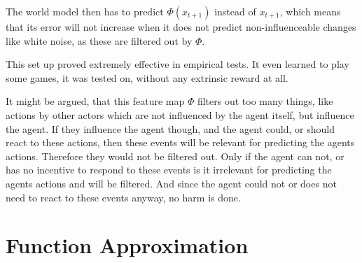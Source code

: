 The world model then has to predict \(\Phi(x_{t+1})\) instead of \(x_{t+1}\), which means that its error will not increase when it does not predict non-influenceable changes like white noise, as these are filtered out by \(\Phi\).

This set up proved extremely effective in empirical tests. It even learned to play some games, it was tested on, without any extrinsic reward at all. 

It might be argued, that this feature map \(\Phi\) filters out too many things, like actions by other actors which are not influenced by the agent itself, but influence the agent. If they influence the agent though, and the agent could, or should react to these actions, then these events will be relevant for predicting the agents actions. Therefore they would not be filtered out. Only if the agent can not, or has no incentive to respond to these events is it irrelevant for predicting the agents actions and will be filtered. And since the agent could not or does not need to react to these events anyway, no harm is done. 




\section{Function Approximation}



\endinput

